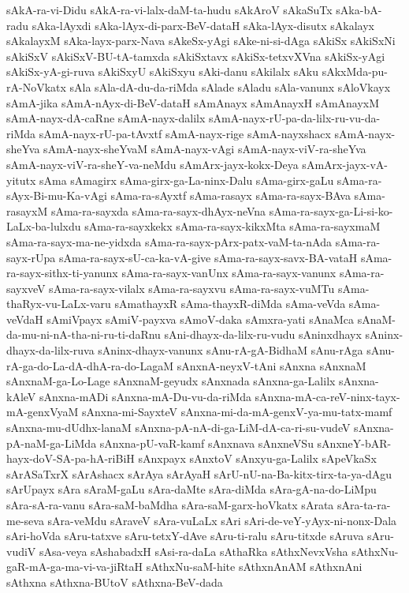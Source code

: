{sAkA-ra-vi-Didu
sAkA-ra-vi-lalx-daM-ta-hudu
sAkAroV
sAkaSuTx
sAka-bA-radu
sAka-lAyxdi
sAka-lAyx-di-parx-BeV-dataH
sAka-lAyx-disutx
sAkalayx
sAkalayxM
sAka-layx-parx-Nava
sAkeSx-yAgi
sAke-ni-si-dAga
sAkiSx
sAkiSxNi
sAkiSxV
sAkiSxV-BU-tA-tamxda
sAkiSxtavx
sAkiSx-tetxvXVna
sAkiSx-yAgi
sAkiSx-yA-gi-ruva
sAkiSxyU
sAkiSxyu
sAki-danu
sAkilalx
sAku
sAkxMda-pu-rA-NoVkatx
sAla
sAla-dA-du-da-riMda
sAlade
sAladu
sAla-vanunx
sAloVkayx
sAmA-jika
sAmA-nAyx-di-BeV-dataH
sAmAnayx
sAmAnayxH
sAmAnayxM
sAmA-nayx-dA-caRne
sAmA-nayx-dalilx
sAmA-nayx-rU-pa-da-lilx-ru-vu-da-riMda
sAmA-nayx-rU-pa-tAvxtf
sAmA-nayx-rige
sAmA-nayxshacx
sAmA-nayx-sheYva
sAmA-nayx-sheYvaM
sAmA-nayx-vAgi
sAmA-nayx-viV-ra-sheYva
sAmA-nayx-viV-ra-sheY-va-neMdu
sAmArx-jayx-kokx-Deya
sAmArx-jayx-vA-yitutx
sAma
sAmagirx
sAma-girx-ga-La-ninx-Dalu
sAma-girx-gaLu
sAma-ra-sAyx-Bi-mu-Ka-vAgi
sAma-ra-sAyxtf
sAma-rasayx
sAma-ra-sayx-BAva
sAma-rasayxM
sAma-ra-sayxda
sAma-ra-sayx-dhAyx-neVna
sAma-ra-sayx-ga-Li-si-ko-LaLx-ba-lulxdu
sAma-ra-sayxkekx
sAma-ra-sayx-kikxMta
sAma-ra-sayxmaM
sAma-ra-sayx-ma-ne-yidxda
sAma-ra-sayx-pArx-patx-vaM-ta-nAda
sAma-ra-sayx-rUpa
sAma-ra-sayx-sU-ca-ka-vA-give
sAma-ra-sayx-savx-BA-vataH
sAma-ra-sayx-sithx-ti-yanunx
sAma-ra-sayx-vanUnx
sAma-ra-sayx-vanunx
sAma-ra-sayxveV
sAma-ra-sayx-vilalx
sAma-ra-sayxvu
sAma-ra-sayx-vuMTu
sAma-thaRyx-vu-LaLx-varu
sAmathayxR
sAma-thayxR-diMda
sAma-veVda
sAma-veVdaH
sAmiVpayx
sAmiV-payxva
sAmoV-daka
sAmxra-yati
sAnaMca
sAnaM-da-mu-ni-nA-tha-ni-ru-ti-daRnu
sAni-dhayx-da-lilx-ru-vudu
sAninxdhayx
sAninx-dhayx-da-lilx-ruva
sAninx-dhayx-vanunx
sAnu-rA-gA-BidhaM
sAnu-rAga
sAnu-rA-ga-do-La-dA-dhA-ra-do-LagaM
sAnxnA-neyxV-tAni
sAnxna
sAnxnaM
sAnxnaM-ga-Lo-Lage
sAnxnaM-geyudx
sAnxnada
sAnxna-ga-Lalilx
sAnxna-kAleV
sAnxna-mADi
sAnxna-mA-Du-vu-da-riMda
sAnxna-mA-ca-reV-ninx-tayx-mA-genxVyaM
sAnxna-mi-SayxteV
sAnxna-mi-da-mA-genxV-ya-mu-tatx-mamf
sAnxna-mu-dUdhx-lanaM
sAnxna-pA-nA-di-ga-LiM-dA-ca-ri-su-vudeV
sAnxna-pA-naM-ga-LiMda
sAnxna-pU-vaR-kamf
sAnxnava
sAnxneVSu
sAnxneY-bAR-hayx-doV-SA-pa-hA-riBiH
sAnxpayx
sAnxtoV
sAnxyu-ga-Lalilx
sApeVkaSx
sArASaTxrX
sArAshacx
sArAya
sArAyaH
sArU-nU-na-Ba-kitx-tirx-ta-ya-dAgu
sArUpayx
sAra
sAraM-gaLu
sAra-daMte
sAra-diMda
sAra-gA-na-do-LiMpu
sAra-sA-ra-vanu
sAra-saM-baMdha
sAra-saM-garx-hoVkatx
sArata
sAra-ta-ra-me-seva
sAra-veMdu
sAraveV
sAra-vuLaLx
sAri
sAri-de-veY-yAyx-ni-nonx-Dala
sAri-hoVda
sAru-tatxve
sAru-tetxY-dAve
sAru-ti-ralu
sAru-titxde
sAruva
sAru-vudiV
sAsa-veya
sAshabadxH
sAsi-ra-daLa
sAthaRka
sAthxNevxVsha
sAthxNu-gaR-mA-ga-ma-vi-va-jiRtaH
sAthxNu-saM-hite
sAthxnAnAM
sAthxnAni
sAthxna
sAthxna-BUtoV
sAthxna-BeV-dada
}
